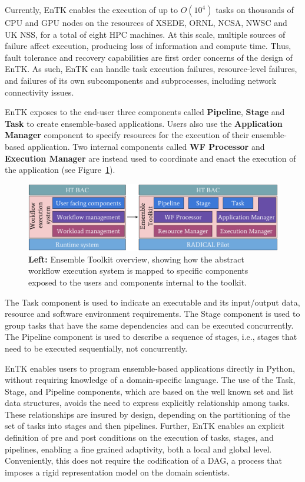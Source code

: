 Currently, EnTK enables the execution of up to \(O(10^4)\) tasks on thousands
of CPU and GPU nodes on the resources of XSEDE, ORNL, NCSA, NWSC and UK NSS,
for a total of eight HPC machines. At this scale, multiple sources of failure
affect execution, producing loss of information and compute time. Thus, fault
tolerance and recovery capabilities are first order concerns of the design of
EnTK\@. As such, EnTK can handle task execution failures, resource-level
failures, and failures of its own subcomponents and subprocesses, including
network connectivity issues.

EnTK exposes to the end-user three components called \textbf{Pipeline},
\textbf{Stage} and \textbf{Task} to create ensemble-based applications. Users
also use the \textbf{Application Manager} component to specify resources for
the execution of their ensemble-based application. Two internal components
called \textbf{WF Processor} and \textbf{Execution Manager} are instead used
to coordinate and enact the execution of the application (see
Figure~\ref{fig:entk_arch}).

\begin{figure}
  \centering
  \includegraphics[width=\columnwidth]{FIGURES/entk_overview.pdf}
  \caption{\textbf{Left:} Ensemble Toolkit overview, showing how the abstract
           workflow execution system is mapped to specific components exposed
           to the users and components internal to the
           toolkit.}\label{fig:entk_arch}
\end{figure}

The Task component is used to indicate an executable  and its input/output
data, resource and software environment requirements. The Stage component is
used to group tasks that have the same dependencies and can be executed
concurrently. The Pipeline component is used to describe a sequence of
stages, i.e., stages that need to be executed sequentially, not concurrently.

EnTK enables users to program ensemble-based applications directly in Python,
without requiring knowledge of a domain-specific language. The use of the
Task, Stage, and Pipeline components, which are based on the well known set
and list data structures, avoids the need to express explicitly relationship
among tasks. These relationships are insured by design, depending on the
partitioning of the set of tasks into stages and then pipelines. Further,
EnTK enables an explicit definition of pre and post conditions on the
execution of tasks, stages, and pipelines, enabling a fine grained
adaptivity, both a local and global level. Conveniently, this does not
require the codification of a DAG, a process that imposes a rigid
representation model on the domain scientists.

